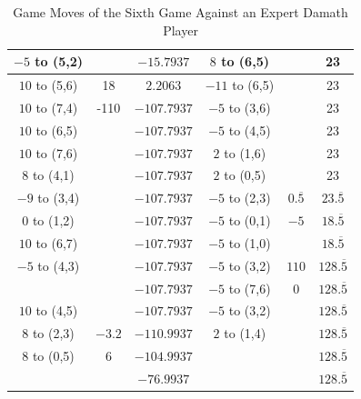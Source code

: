 \begin{appendices}
\begin{table}[H]
\begin{tabular}{cccccc}
          $-5$ to (5,2)  &        &  $-15.7937$ & $8$ to (6,5) &    &  23    \\ \hline
          $10$ to (5,6)  & 18     &  $2.2063$   & $-11$ to (6,5) &    &  23    \\ \hline
          $10$ to (7,4)  & -110   &  $-107.7937$ & $-5$ to (3,6) &    &  23    \\ \hline
          $10$ to (6,5)  &        &  $-107.7937$ & $-5$ to (4,5) &    &  23    \\ \hline
          $10$ to (7,6)  &        &  $-107.7937$ & $2$ to (1,6) &    &  23    \\ \hline
          $8$ to (4,1)  &        &  $-107.7937$ & $2$ to (0,5) &    &  23    \\ \hline
          $-9$ to (3,4)  &        &  $-107.7937$ & $-5$ to (2,3) & $0.\overline{5}$    &  $23.\overline5$   \\ \hline
          $0$ to (1,2)  &        &  $-107.7937$ & $-5$ to (0,1) & $-5$    &  $18.\overline5$   \\ \hline
          $10$ to (6,7) &        &  $-107.7937$ & $-5$ to (1,0) &         &  $18.\overline5$   \\ \hline
          $-5$ to (4,3) &        &  $-107.7937$ & $-5$ to (3,2) & $110$     &  $128.\overline5$   \\ \hline
                        &        &  $-107.7937$ & $-5$ to (7,6) & $0$       &  $128.\overline5$   \\ \hline
          $10$ to (4,5) &        &  $-107.7937$ & $-5$ to (3,2) &           &  $128.\overline5$   \\ \hline
          $8$ to (2,3) & $-3.2$  &  $-110.9937$ & $2$ to (1,4) &           &  $128.\overline5$   \\ \hline
          $8$ to (0,5) & 6       &  $-104.9937$ &              &           &  $128.\overline5$   \\ \hline \hline
                       &         &  $-76.9937$ &             &           &  $128.\overline5$   \\ \hline
    \end{tabular}
    \caption{Game Moves of the Sixth Game Against an Expert Damath Player}
    \label{tab:sixth-game}
\end{table}


\end{appendices}
